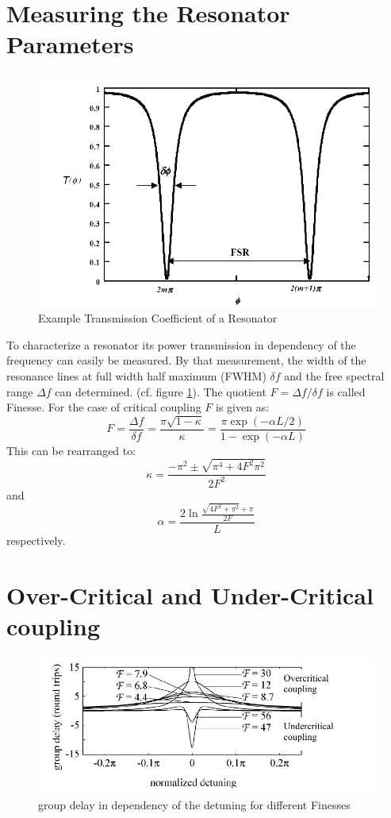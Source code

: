 \section{Measuring the Resonator Parameters}

\begin{figure}[h]%
\centering
\includegraphics[width=.5\columnwidth]{Grafiken/S21.pdf}%
\caption{Example Transmission Coefficient of a Resonator}%
\label{fig:S21}%
\end{figure}

To characterize a resonator its power transmission in dependency of the frequency can easily be measured. By that measurement, the width of the resonance lines at full width half maximum (FWHM) $\delta f$ and the free spectral range $\Delta f$ can determined. (cf. figure \ref{fig:S21}). The quotient $F= \Delta f/\delta f$ is called Finesse. For the case of critical coupling $F$ is given as:
\begin{equation}
 F = \frac{\Delta f}{\delta f} = \frac{\pi\sqrt{1-\kappa}}{\kappa}=\frac{\pi\exp\left(-\alpha L/2\right)}{1-\exp\left(-\alpha L\right)}
\end{equation}
This can be rearranged to:
\begin{equation}
 \kappa = \frac{-\pi^2 \pm \sqrt{\pi^4+4F^2\pi^2}}{2F^2}
\end{equation}
and
\begin{equation}
\alpha = \frac{2\ln\frac{\sqrt{4F^2+\pi^2}+\pi}{2F}}{L} 
\end{equation}
respectively.

\section{Over-Critical and Under-Critical coupling}

\begin{figure}[h]%
\centering
\includegraphics[width=.7\columnwidth]{Grafiken/crit_coupling.pdf}%
\caption{group delay in dependency of the detuning for different Finesses}%
\label{fig:crit_coupling}%
\end{figure}

